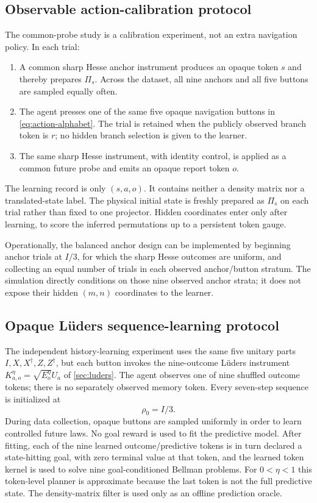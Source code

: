 \documentclass[11pt]{article}
\theoremstyle{definition}
\theoremstyle{remark}
\begin{document}
\subsection{Observable action-calibration protocol}
\label{sec:probe-protocol}

The common-probe study is a calibration experiment, not an extra navigation
policy.  In each trial:
\begin{enumerate}
\item A common sharp Hesse anchor instrument produces an opaque token \(s\)
and thereby prepares \(\Pi_s\).  Across the dataset, all nine anchors and all
five buttons are sampled equally often.
\item The agent presses one of the same five opaque navigation buttons in
\cref{eq:action-alphabet}.  The trial is retained when the publicly observed
branch token is \(r\); no hidden branch selection is given to the learner.
\item The same sharp Hesse instrument, with identity control, is applied as a
common future probe and emits an opaque report token \(o\).
\end{enumerate}
The learning record is only \((s,a,o)\).  It contains neither a density matrix
nor a translated-state label.  The physical initial state is freshly prepared
as \(\Pi_s\) on each trial rather than fixed to one projector.  Hidden
coordinates enter only after learning, to score the inferred permutations up
to a persistent token gauge.

Operationally, the balanced anchor design can be implemented by beginning
anchor trials at \(I/3\), for which the sharp Hesse outcomes are uniform, and
collecting an equal number of trials in each observed anchor/button stratum.
The simulation directly conditions on those nine observed anchor strata; it
does not expose their hidden \((m,n)\) coordinates to the learner.

\subsection{Opaque Lüders sequence-learning protocol}
\label{sec:luders-protocol}

The independent history-learning experiment uses the same five unitary parts
\(I,X,X^\dagger,Z,Z^\dagger\), but each button invokes the nine-outcome
Lüders instrument \(K_{a,o}^\eta=\sqrt{E_o^\eta}U_a\) of
\cref{sec:luders}.  The agent observes one of nine shuffled outcome tokens;
there is no separately observed memory token.  Every seven-step sequence is
initialized at
\begin{equation}
 \rho_0=I/3.
 \label{eq:luders-start}
\end{equation}
During data collection, opaque buttons are sampled uniformly in order to learn
controlled future laws.  No goal reward is used to fit the predictive model.
After fitting, each of the nine learned outcome/predictive tokens is in turn
declared a state-hitting goal, with zero terminal value at that token, and the
learned token kernel is used to solve nine goal-conditioned Bellman problems.
For \(0<\eta<1\) this token-level planner is approximate because the last token
is not the full predictive state.  The density-matrix filter is used only as an
offline prediction oracle.
\end{document}
